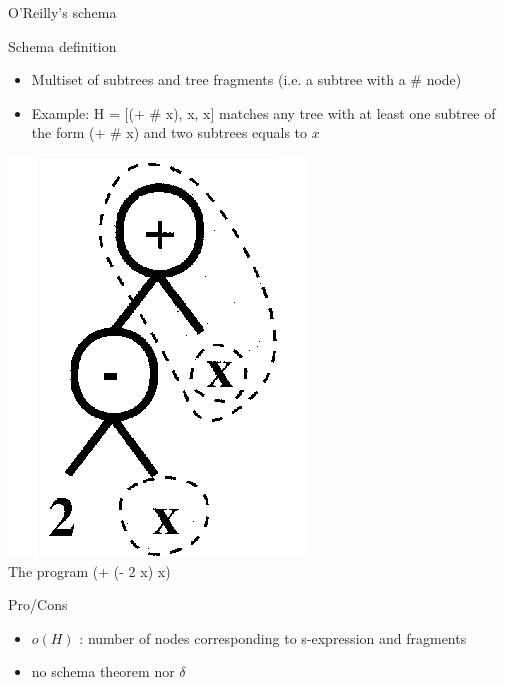 \begin{frame}{O'Reilly's schema}
  \begin{block}{Schema definition}
    \begin{itemize}
      \item Multiset of subtrees and tree fragments (i.e. a subtree with a \# node)\cite{oreilly1994}
      \item Example: H = [(+ \# x), x, x] matches any tree with at least one subtree of the form (+ \# x) and two subtrees equals to $x$
    \end{itemize}
  \end{block}

  \begin{center}
    \includegraphics[scale=0.90]{img/schemar}\\
    The program (+ (- 2 x) x)
  \end{center}

    \begin{block}{Pro/Cons}
      \begin{itemize}
        \item<pro@1> $o(H)$ : number of nodes corresponding to s-expression and fragments
        \item<con@1> no schema theorem nor $\delta$
      \end{itemize}
    \end{block}
\end{frame}

